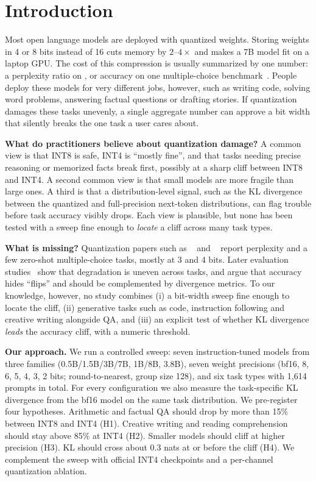 \section{Introduction}
\label{sec:intro}

Most open language models are deployed with quantized weights. Storing weights in 4 or 8 bits instead of 16 cuts memory by $2$--$4\times$ and makes a 7B model fit on a laptop GPU. The cost of this compression is usually summarized by one number: a perplexity ratio on \wikitext, or accuracy on one multiple-choice benchmark~\cite{frantar2023gptq,lin2024awq,dettmers2023case}. People deploy these models for very different jobs, however, such as writing code, solving word problems, answering factual questions or drafting stories. If quantization damages these tasks unevenly, a single aggregate number can approve a bit width that silently breaks the one task a user cares about.

{\bf What do practitioners believe about quantization damage?} A common view is that INT8 is safe, INT4 is ``mostly fine'', and that tasks needing precise reasoning or memorized facts break first, possibly at a sharp cliff between INT8 and INT4. A second common view is that small models are more fragile than large ones. A third is that a distribution-level signal, such as the KL divergence between the quantized and full-precision next-token distributions, can flag trouble before task accuracy visibly drops. Each view is plausible, but none has been tested with a sweep fine enough to \emph{locate} a cliff across many task types.

{\bf What is missing?} Quantization papers such as \gptq~\cite{frantar2023gptq} and \awq~\cite{lin2024awq} report perplexity and a few zero-shot multiple-choice tasks, mostly at 3 and 4 bits. Later evaluation studies~\cite{li2024evaluating,jin2024comprehensive,marchisio2024quantization} show that degradation is uneven across tasks, and \citet{dutta2024accuracy} argue that accuracy hides ``flips'' and should be complemented by divergence metrics. To our knowledge, however, no study combines (i) a bit-width sweep fine enough to locate the cliff, (ii) generative tasks such as code, instruction following and creative writing alongside QA, and (iii) an explicit test of whether KL divergence \emph{leads} the accuracy cliff, with a numeric threshold.

{\bf Our approach.} We run a controlled sweep: seven instruction-tuned models from three families (\qwen 0.5B/1.5B/3B/7B, \llama 1B/8B, \phithree 3.8B), seven weight precisions (bf16, 8, 6, 5, 4, 3, 2 bits; round-to-nearest, group size 128), and six task types with 1,614 prompts in total. For every configuration we also measure the task-specific KL divergence from the bf16 model on the same task distribution. We pre-register four hypotheses. Arithmetic and factual QA should drop by more than 15\% between INT8 and INT4 (H1). Creative writing and reading comprehension should stay above 85\% at INT4 (H2). Smaller models should cliff at higher precision (H3). KL should cross about 0.3 nats at or before the cliff (H4). We complement the sweep with official \awq INT4 checkpoints and a per-channel quantization ablation.

